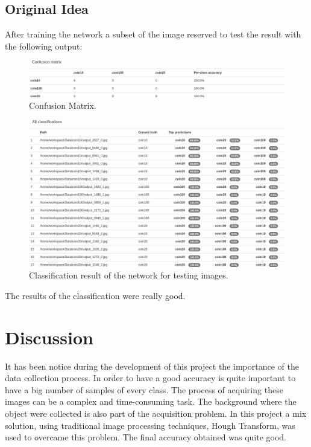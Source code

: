 \documentclass[10pt,journal,compsoc]{IEEEtran}
\begin{document}
\subsection{Original Idea}

After training the network a subset of the image reserved to test the result with the following output:

\begin{figure}[h]
\centering
\includegraphics[scale=0.2]{confusion-matrix}
\caption{Confusion Matrix.}
\label{fig:figure5}
\end{figure}


\begin{figure}[h]
\centering
\includegraphics[scale=0.2]{classification-all}
\caption{Classification result of the network for testing images.}
\label{fig:figure6}
\end{figure}

The results of the classification were really good. 

\section{Discussion}

It has been notice during the development of this project the importance of the data collection process. In order to have a good accuracy is quite important to have a big number of samples of every class. The process of acquiring these images can be a complex and time-consuming task. The background where the object were collected is also part of the acquisition problem. In this project a mix solution, using traditional image processing techniques, Hough Transform, was used to overcame this problem. The final accuracy obtained was quite good. 
\end{document}
